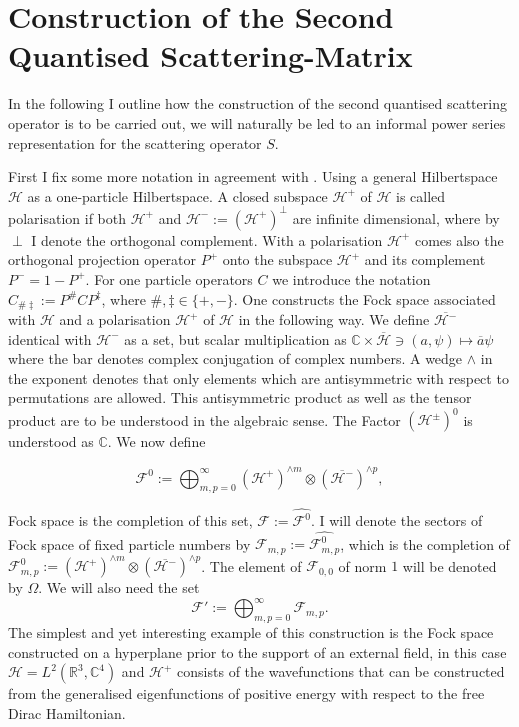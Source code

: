 \documentclass[b5paper,draft,openbib,12pt]{memoir}
\begin{document}
\section{Construction of the Second Quantised Scattering-Matrix}\label{sec:second quant}
 In the following I outline how the construction of the
second quantised scattering operator is to be carried out, we will naturally be
led to an informal power series representation for the scattering operator \(S\). 

First I fix some more notation in agreement with \cite{ivp2}. Using a general Hilbertspace \(\mathcal{H}\) as a one-particle Hilbertspace. 
A closed subspace \(\mathcal{H}^+\) of \(\mathcal{H}\) is called polarisation if both \(\mathcal{H}^+\) and \(\mathcal{H}^-:=\left(\mathcal{H}^+\right)^\perp\)
are infinite dimensional, where by \(\perp\) I denote the orthogonal complement. With a polarisation \(\mathcal{H}^+\) comes also the orthogonal
projection operator \(P^+\) onto the subspace \(\mathcal{H}^+\) and its complement \(P^-=1-P^+\). For one particle operators \(C\) we 
introduce the notation \(C_{\#\ddag}:= P^\# C P^\ddag\), where \(\#,\ddag\in\{+,-\}\).
One constructs the Fock space associated with \(\mathcal{H}\) and a polarisation \(\mathcal{H}^+\) of \(\mathcal{H}\) in the following way.
We define \(\overline{\mathcal{H}^-}\) identical with \(\mathcal{H}^-\) as a set, but scalar multiplication as 
\(\mathbb{C}\times \overline{\mathcal{H}} \ni (a, \psi)\mapsto \overline{a} \psi\) where the bar denotes complex conjugation of complex numbers.
A wedge \(\wedge\) in the exponent denotes that only elements which are antisymmetric with respect to permutations
are allowed. This antisymmetric product as well as the tensor product are to be understood in the algebraic sense. 
The Factor \(\left(\mathcal{H}^{\pm}\right)^0\) is understood as
\(\mathbb{C}\). We now define

\begin{equation}
\mathcal{F}^0:=\bigoplus_{m,p=0}^\infty \left(\mathcal{H}^+ \right)^{\wedge m} \otimes \left(\overline{\mathcal{H}^- }\right)^{\wedge p},
\end{equation}

Fock space is the completion of this set, \(\mathcal{F}:=\widehat{\mathcal{F}^0}\).
I will denote the sectors of Fock space of fixed particle
numbers by \(\mathcal{F}_{m,p}:=\widehat{\mathcal{F}^0_{m,p}}\), which is the 
completion of \(\mathcal{F}^0_{m,p}:=\left(\mathcal{H}^+ \right)^{\wedge m}
\otimes \left(\overline{\mathcal{H}^-} \right)^{\wedge p}\). The element of
\(\mathcal{F}_{0,0}\) of norm \(1\) will be denoted by \(\Omega\). We will also need
the set
\begin{equation}
\mathcal{F}':=\bigoplus_{m,p=0}^\infty \mathcal{F}_{m,p}.
\end{equation}
The simplest and yet interesting example of this construction is
the Fock space constructed on a hyperplane prior to the support of an external field,
in this case \(\mathcal{H}=L^2(\mathbb{R}^3,\mathbb{C}^4)\) and \(\mathcal{H}^+\)
consists of the wavefunctions that can be constructed from the generalised eigenfunctions
of positive energy with respect to the free Dirac Hamiltonian.
\end{document}
